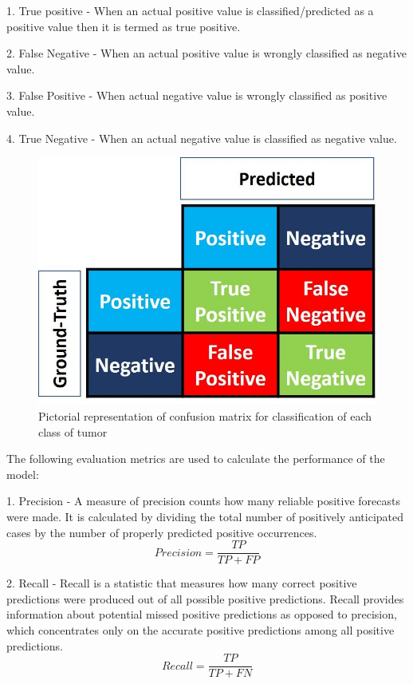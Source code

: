 \documentclass[12pt, a4paper,twoside]{report}
\theoremstyle{plain} %
\theoremstyle{definition} %
\theoremstyle{remark} %
\numberwithin{equation}{chapter}
\begin{document}
1. True positive - When an actual positive value is classified/predicted as a positive value then it is termed as true positive.

2. False Negative - When an actual positive value is wrongly classified as negative value.

3. False Positive - When actual negative value is wrongly classified as positive value.

4. True Negative - When an actual negative value is classified as negative value.

\begin{figure}
    \centering
    \includegraphics[scale=0.3]{Fig01.jpg}
    \caption{Pictorial representation of confusion matrix for classification of each class of tumor}
    \label{fig:con_mat_eg}
\end{figure}

The following evaluation metrics are used to calculate the performance of the model: 

1. Precision - A measure of precision counts how many reliable positive forecasts were made. It is calculated by dividing the total number of positively anticipated cases by the number of properly predicted positive occurrences.
\begin{equation}
    Precision = \frac{TP}{TP+FP}
\end{equation}

2. Recall -  Recall is a statistic that measures how many correct positive predictions were produced out of all possible positive predictions. Recall provides information about potential missed positive predictions as opposed to precision, which concentrates only on the accurate positive predictions among all positive predictions.
\begin{equation}
    Recall = \frac{TP}{TP+FN}
\end{equation}
\end{document}

